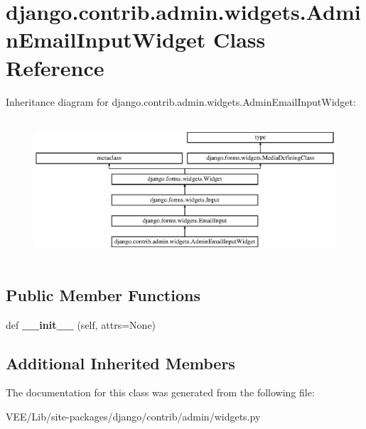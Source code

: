 \hypertarget{classdjango_1_1contrib_1_1admin_1_1widgets_1_1_admin_email_input_widget}{}\section{django.\+contrib.\+admin.\+widgets.\+Admin\+Email\+Input\+Widget Class Reference}
\label{classdjango_1_1contrib_1_1admin_1_1widgets_1_1_admin_email_input_widget}
Inheritance diagram for django.\+contrib.\+admin.\+widgets.\+Admin\+Email\+Input\+Widget\+:\begin{figure}[H]
\begin{center}
\leavevmode
\includegraphics[height=5.283019cm]{classdjango_1_1contrib_1_1admin_1_1widgets_1_1_admin_email_input_widget}
\end{center}
\end{figure}
\subsection*{Public Member Functions}
\begin{DoxyCompactItemize}
\item 
\mbox{\label{classdjango_1_1contrib_1_1admin_1_1widgets_1_1_admin_email_input_widget_ac2afdbed8596546f6ba2ff333509859b}} 
def {\bfseries \+\_\+\+\_\+init\+\_\+\+\_\+} (self, attrs=None)
\end{DoxyCompactItemize}
\subsection*{Additional Inherited Members}


The documentation for this class was generated from the following file\+:\begin{DoxyCompactItemize}
\item 
V\+E\+E/\+Lib/site-\/packages/django/contrib/admin/widgets.\+py\end{DoxyCompactItemize}
